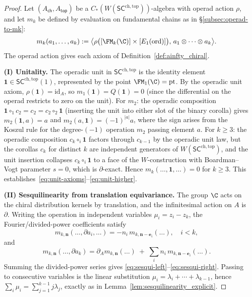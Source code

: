 \begin{proof}
Let $(A_{\mathsf{ch}}, A_{\mathsf{top}})$ be a $C_\ast(W(\mathsf{SC}^{\mathrm{ch,top}}))$-algebra with operad action $\rho$, and let $m_k$ be defined by evaluation on fundamental chains as in \S\ref{subsec:operad-to-mk}:
\[
m_k(a_1,\ldots,a_k) := \bigl\langle \rho\bigl([\FM_k(\C)] \times [E_1(\mathrm{ord})]\bigr),\, a_1 \otimes \cdots \otimes a_k \bigr\rangle.
\]
The operad action gives each axiom of
Definition~\ref{def:ainfty_chiral}.

\medskip
\textbf{(I) Unitality.}
The operadic unit in $\mathsf{SC}^{\mathrm{ch,top}}$ is the identity element $\mathbf{1} \in \mathsf{SC}^{\mathrm{ch,top}}(1)$, represented by the point $\FM_1(\C) = \mathrm{pt}$. By the operadic unit axiom, $\rho(\mathbf{1}) = \mathrm{id}_A$, so $m_1(\mathbf{1}) = Q(\mathbf{1}) = 0$ (since the differential on the operad restricts to zero on the unit). For $m_2$: the operadic composition $\mathbf{1} \circ_1 c_2 = c_2 = c_2 \circ_2 \mathbf{1}$ (inserting the unit into either slot of the binary corolla) gives $m_2(\mathbf{1}, a) = a$ and $m_2(a, \mathbf{1}) = (-1)^{|a|} a$, where the sign arises from the Koszul rule for the degree-$(-1)$ operation $m_2$ passing element $a$. For $k \geq 3$: the operadic composition $c_k \circ_i \mathbf{1}$ factors through $c_{k-1}$ by the operadic unit law, but the corollas $c_k$ for distinct $k$ are independent generators of $W(\mathsf{SC}^{\mathrm{ch,top}})$, and the unit insertion collapses $c_k \circ_i \mathbf{1}$ to a face of the $W$-construction with Boardman--Vogt parameter $s = 0$, which is $\partial$-exact. Hence $m_k(\ldots, \mathbf{1}, \ldots) = 0$ for $k \geq 3$. This establishes~\eqref{eq:unit-axioms}--\eqref{eq:unit-higher}.

\medskip
\textbf{(II) Sesquilinearity from translation equivariance.}
The group \(\C\) acts on the chiral distribution kernels by
translation, and the infinitesimal action on \(A\) is \(\partial\).
Writing the operation in independent variables \(\mu_i=z_i-z_k\), the
Fourier/divided-power coefficients satisfy
\[
m_{k,\mathbf n}(\ldots,\partial a_i,\ldots)
=-n_i\,m_{k,\mathbf n-\mathbf e_i}(\ldots),
\quad i<k,
\]
and
\[
m_{k,\mathbf n}(\ldots,\partial a_k)
=\partial_A m_{k,\mathbf n}(\ldots)
\;+\;
\sum_i n_i\,m_{k,\mathbf n-\mathbf e_i}(\ldots).
\]
Summing the divided-power series gives
\eqref{eq:sesqui-left}--\eqref{eq:sesqui-right}.  Passing to
consecutive variables is the linear substitution
\(\mu_i=\lambda_i+\cdots+\lambda_{k-1}\), hence
\(\sum_i\mu_i=\sum_{j=1}^{k-1}j\lambda_j\), exactly as in
Lemma~\ref{lem:sesquilinearity_explicit}.


\end{proof}
